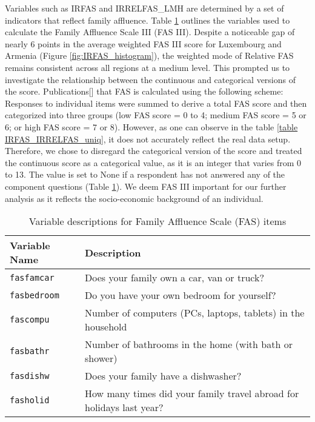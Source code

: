 \documentclass[main.tex]{subfiles}
\begin{document}
Variables such as IRFAS and IRRELFAS\_LMH are determined by a set of indicators that reflect family affluence. Table \ref{tab:FAS_variables} outlines the variables used to calculate the Family Affluence Scale III (FAS III). Despite a noticeable gap of nearly 6 points in the average weighted FAS III score for Luxembourg and Armenia (Figure \ref{fig:IRFAS_histogram}), the weighted mode of Relative FAS remains consistent across all regions at a medium level. This prompted us to investigate the relationship between the continuous and categorical versions of the score. Publications[\cite{McCormack2011}] that FAS is calculated using the following scheme: Responses to individual items were summed to derive a total FAS score and then categorized into three groups (low FAS score = 0 to 4; medium FAS score = 5 or 6; or high FAS score = 7 or 8). However, as one can observe in the table \ref{table IRFAS_IRRELFAS_uniq}, it does not accurately reflect the real data setup. Therefore, we chose to disregard the categorical version of the score and treated the continuous score as a categorical value, as it is an integer that varies from 0 to 13. The value is set to None if a respondent has not answered any of the component questions (Table \ref{tab:FAS_variables}). We deem FAS III important for our further analysis as it reflects the socio-economic background of an individual.
\begin{table}[ht]
\centering
\begin{tabular}{|l|l@{}|}
\toprule
\textbf{Variable Name} & \textbf{Description} \\
\midrule
\texttt{fasfamcar}   & Does your family own a car, van or truck? \\
\texttt{fasbedroom}  & Do you have your own bedroom for yourself? \\
\texttt{fascompu}    & Number of computers (PCs, laptops, tablets) in the household \\
\texttt{fasbathr}    & Number of bathrooms in the home (with bath or shower) \\
\texttt{fasdishw}    & Does your family have a dishwasher? \\
\texttt{fasholid}    & How many times did your family travel abroad for holidays last year? \\
\bottomrule
\end{tabular}
\caption{Variable descriptions for Family Affluence Scale (FAS) items}
\label{tab:FAS_variables}
\end{table}
\end{document}
